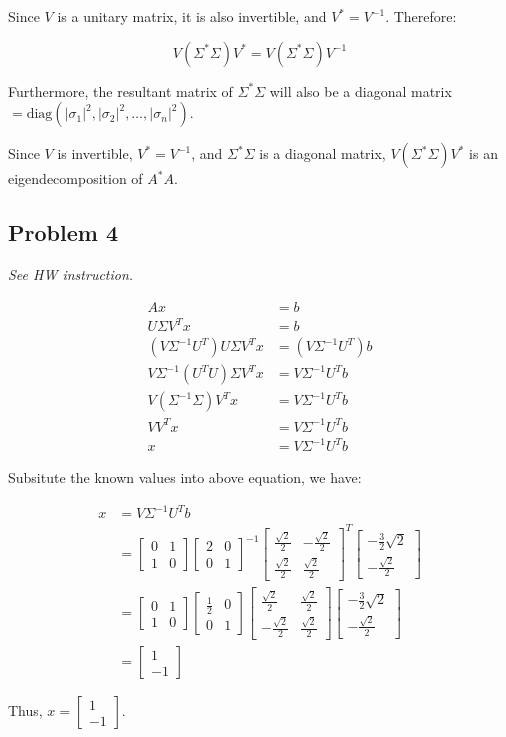 \documentclass[11pt]{article}
\providecommand{\qbm}[1]{\begin{bmatrix} #1 \end{bmatrix}}
\begin{document}
Since $V$ is a unitary matrix, it is also invertible, and $V^{*}=V^{-1}$. Therefore:

\begin{equation*}
    V (\Sigma^{*} \Sigma) V^{*} = V (\Sigma^{*} \Sigma) V^{-1}
\end{equation*}

Furthermore, the resultant matrix of $\Sigma^{*}\Sigma$ will also be a diagonal matrix $=\text{diag}(|\sigma_1|^2,|\sigma_2|^2,\dots, |\sigma_n|^2)$.\newline

Since $V$ is invertible, $V^{*} = V^{-1}$, and $\Sigma^{*}\Sigma$ is a diagonal matrix, $V (\Sigma^{*}\Sigma) V^{*}$ is an eigendecomposition of $A^{*}A$.

\subsection*{Problem 4}
\textit{See HW instruction.}\newline

\begin{align*}
    Ax &= b \\
    U \Sigma V^T x &= b \\
    (V \Sigma^{-1} U^T) U \Sigma V^T x &= (V \Sigma^{-1} U^T)b \\
    V \Sigma^{-1} (U^T U) \Sigma V^T x &= V \Sigma^{-1} U^T b \\
    V (\Sigma^{-1} \Sigma) V^T x &= V \Sigma^{-1} U^T b \\
    V V^T x &=V \Sigma^{-1} U^T b \\
    x &= V \Sigma^{-1} U^T b
\end{align*}

Subsitute the known values into above equation, we have:

\begin{align*}
    x &= V \Sigma^{-1} U^T b \\
    &= \qbm{0 & 1 \\ 1 & 0} \qbm{2 & 0 \\ 0 & 1}^{-1} \qbm{\frac{\sqrt{2}}{2} & -\frac{\sqrt{2}}{2} \\ \frac{\sqrt{2}}{2} & \frac{\sqrt{2}}{2}}^T \qbm{-\frac{3}{2} \sqrt{2} \\ -\frac{\sqrt{2}}{2}} \\
    &= \qbm{0 & 1 \\ 1 & 0} \qbm{\frac{1}{2} & 0 \\ 0 & 1} \qbm{\frac{\sqrt{2}}{2} & \frac{\sqrt{2}}{2} \\ -\frac{\sqrt{2}}{2} & \frac{\sqrt{2}}{2}} \qbm{-\frac{3}{2} \sqrt{2} \\ -\frac{\sqrt{2}}{2}} \\
    &= \qbm{1 \\ -1}
\end{align*}

Thus, $x = \qbm{1 \\ -1}$.

\end{document}
